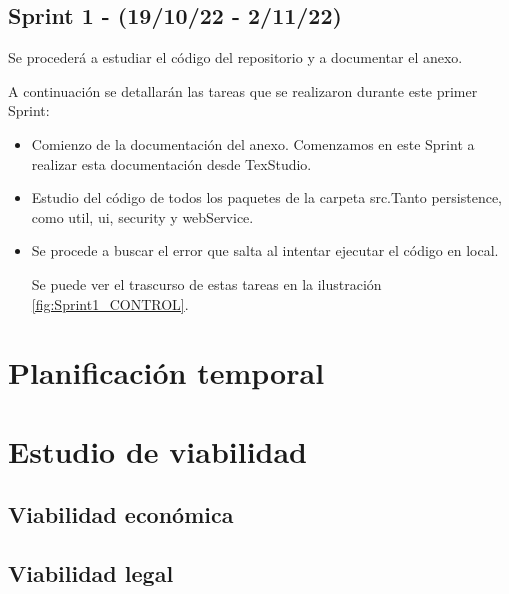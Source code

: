 \subsection{Sprint 1 - (19/10/22 - 2/11/22)}

Se procederá a estudiar el código del repositorio y a documentar el anexo.

A continuación se detallarán las tareas que se realizaron durante este primer Sprint:

\begin{itemize}
	
	\item Comienzo de la documentación del anexo. Comenzamos en este Sprint a realizar esta documentación desde TexStudio.
	
	\item Estudio del código de todos los paquetes de la carpeta src.Tanto persistence, como util, ui, security y webService.
	
	\item Se procede a buscar el error que salta al intentar ejecutar el código en local.
	
	Se puede ver el trascurso de estas tareas en la ilustración \ref{fig:Sprint1_CONTROL}.
	
\end{itemize}


\section{Planificación temporal}

\section{Estudio de viabilidad}

\subsection{Viabilidad económica}

\subsection{Viabilidad legal}


